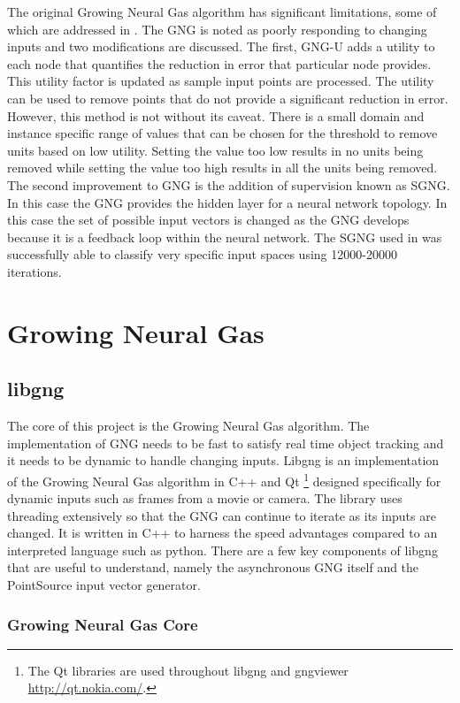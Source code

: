 \documentclass{article}
\renewcommand{\|}{\origbar} %
\begin{document}
The original Growing Neural Gas algorithm has significant limitations, some of which are addressed in . The GNG is noted as poorly responding to changing inputs and two modifications are discussed. The first, GNG-U adds a utility to each node that quantifies the reduction in error that particular node provides. This utility factor is updated as sample input points are processed. The utility can be used to remove points that do not provide a significant reduction in error. However, this method is not without its caveat. There is a small domain and instance specific range of values that can be chosen for the threshold to remove units based on low utility. Setting the value too low results in no units being removed while setting the value too high results in all the units being removed. The second improvement to GNG is the addition of supervision known as SGNG. In this case the GNG provides the hidden layer for a neural network topology. In this case the set of possible input vectors is changed as the GNG develops because it is a feedback loop within the neural network. The SGNG used in  was successfully able to classify very specific input spaces using 12000-20000 iterations.

\section{Growing Neural Gas}
\label{sec:GNG}

\subsection{libgng}

The core of this project is the Growing Neural Gas algorithm. The implementation of GNG needs to be fast to satisfy real time object tracking and it needs to be dynamic to handle changing inputs. Libgng is an implementation of the Growing Neural Gas algorithm in C++ and Qt \footnote{The Qt libraries are used throughout libgng and gngviewer \url{http://qt.nokia.com/}.} designed specifically for dynamic inputs such as frames from a movie or camera. The library uses threading extensively so that the GNG can continue to iterate as its inputs are changed. It is written in C++ to harness the speed advantages compared to an interpreted language such as python. There are a few key components of libgng that are useful to understand, namely the asynchronous GNG itself and the PointSource input vector generator.

\subsubsection{Growing Neural Gas Core}
\end{document}
